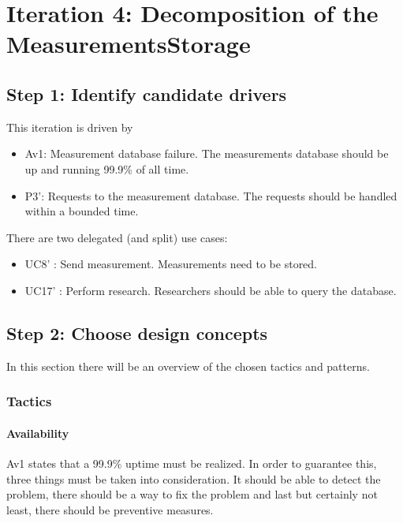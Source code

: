 \section{Iteration 4: Decomposition of the MeasurementsStorage}
\label{add:it4}

\subsection{Step 1: Identify candidate drivers}
\label{add:it4/drivers}

\npar This iteration is driven by

\begin{itemize}
	\item Av1: Measurement database failure. The measurements database should be up
	and running 99.9\% of all time. 
  	\item P3': Requests to the measurement database. The requests should be
  	handled within a bounded time. 
\end{itemize}

\npar There are two delegated (and split) use cases:

\begin{itemize}
  	\item UC8' : Send measurement. Measurements need to be stored.
  	\item UC17' : Perform research. Researchers should be able to query the
  	database.
\end{itemize}

\subsection{Step 2: Choose design concepts}
\label{add:it4/concepts}

\npar In this section there will be an overview of the chosen tactics and
patterns.

\subsubsection{Tactics}
\label{add:it4/tactics}

\paragraph{Availability} 

\npar Av1 states that a 99.9\% uptime must be realized. In order to guarantee
this, three things must be taken into consideration. It should be able to detect
the problem, there should be a way to fix the problem and last but certainly not
least, there should be preventive measures.

